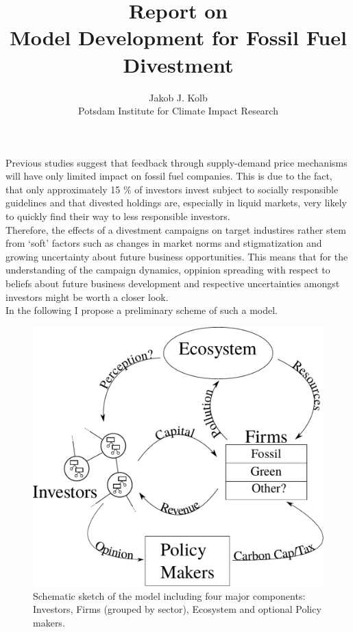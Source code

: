 \title{Report on \\ Model Development for Fossil Fuel Divestment}
\author{Jakob J. Kolb \\ Potsdam Institute for Climate Impact Research}

\maketitle

Previous studies \cite{Ans2013} suggest that feedback through supply-demand price mechanisms will have only limited impact on fossil fuel companies. This is due to the fact, that only approximately 15 \% of investors invest subject to socially responsible guidelines \cite{SIF2014Report} and that divested holdings are, especially in liquid markets, very likely to quickly find their way to less responsible investors. \\
Therefore, the effects of a divestment campaigns on target industires rather stem from `soft' factors such as changes in market norms and stigmatization and growing uncertainty about future business opportunities. This means that for the understanding of the campaign dynamics, oppinion spreading with respect to beliefs about future business development and respective uncertainties amongst investors might be worth a closer look. \\
In the following I propose a preliminary scheme of such a model.

\begin{figure}[h]
	\centering
	\includegraphics[width = .7 \textwidth]{Model_Scheme.pdf}
	\caption{Schematic sketch of the model including four major components: Investors, Firms (grouped by sector), Ecosystem and optional Policy makers.}
	\label{fig:model}
\end{figure}


